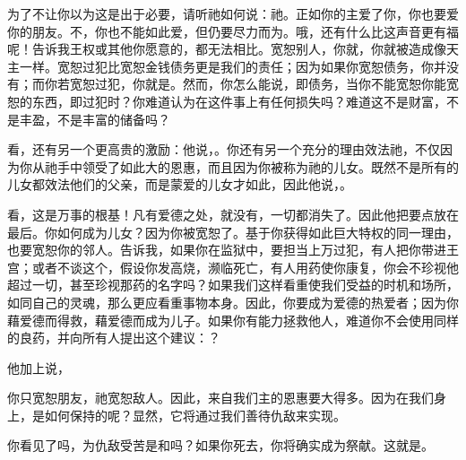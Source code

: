 为了不让你以为这是出于必要，请听祂如何说：祂。正如你的主爱了你，你也要爱你的朋友。不，你也不能如此爱，但仍要尽力而为。哦，还有什么比这声音更有福呢！告诉我王权或其他你愿意的，都无法相比。宽恕别人，你就，你就被造成像天主一样。宽恕过犯比宽恕金钱债务更是我们的责任；因为如果你宽恕债务，你并没有；而你若宽恕过犯，你就是。然而，你怎么能说，即债务，当你不能宽恕你能宽恕的东西，即过犯时？你难道认为在这件事上有任何损失吗？难道这不是财富，不是丰盈，不是丰富的储备吗？\par

看，还有另一个更高贵的激励：他说，。你还有另一个充分的理由效法祂，不仅因为你从祂手中领受了如此大的恩惠，而且因为你被称为祂的儿女。既然不是所有的儿女都效法他们的父亲，而是蒙爱的儿女才如此，因此他说，。\par

 \par

看，这是万事的根基！凡有爱德之处，就没有，一切都消失了。因此他把要点放在最后。你如何成为儿女？因为你被宽恕了。基于你获得如此巨大特权的同一理由，也要宽恕你的邻人。告诉我，如果你在监狱中，要担当上万过犯，有人把你带进王宫；或者不谈这个，假设你发高烧，濒临死亡，有人用药使你康复，你会不珍视他超过一切，甚至珍视那药的名字吗？如果我们这样看重使我们受益的时机和场所，如同自己的灵魂，那么更应看重事物本身。因此，你要成为爱德的热爱者；因为你藉爱德而得救，藉爱德而成为儿子。如果你有能力拯救他人，难道你不会使用同样的良药，并向所有人提出这个建议：？\par

他加上说，\par

你只宽恕朋友，祂宽恕敌人。因此，来自我们主的恩惠要大得多。因为在我们身上，是如何保持的呢？显然，它将通过我们善待仇敌来实现。\par

\par

你看见了吗，为仇敌受苦是和吗？如果你死去，你将确实成为祭献。这就是。\par

 \par

